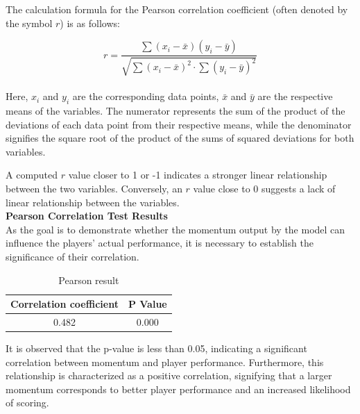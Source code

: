 \documentclass{article}
\begin{document}
The calculation formula for the Pearson correlation coefficient (often denoted by the symbol \(r\)) is as follows:

\[ r = \frac{\sum{(x_i - \bar{x})(y_i - \bar{y})}}{\sqrt{\sum{(x_i - \bar{x})^2} \cdot \sum{(y_i - \bar{y})^2}}} \]
\\
Here, \( x_i \) and \( y_i \) are the corresponding data points, \( \bar{x} \) and \( \bar{y} \) are the respective means of the variables. The numerator represents the sum of the product of the deviations of each data point from their respective means, while the denominator signifies the square root of the product of the sums of squared deviations for both variables.

A computed \( r \) value closer to 1 or -1 indicates a stronger linear relationship between the two variables. Conversely, an \( r \) value close to 0 suggests a lack of linear relationship between the variables.
\\
\textbf{Pearson Correlation Test Results}\\

As the goal is to demonstrate whether the momentum output by the model can influence the players' actual performance, it is necessary to establish the significance of their correlation.
\begin{table}[H]
      \centering
      \begin{tabular}{|c|c|}
      \hline
      \textbf{Correlation coefficient} & \textbf{P Value} \\ \hline
      0.482 &  0.000\\ \hline
      \end{tabular}
      \caption{Pearson result}
\end{table}
It is observed that the p-value is less than 0.05, indicating a significant correlation between momentum and player performance. Furthermore, this relationship is characterized as a positive correlation, signifying that a larger momentum corresponds to better player performance and an increased likelihood of scoring.
\end{document}
